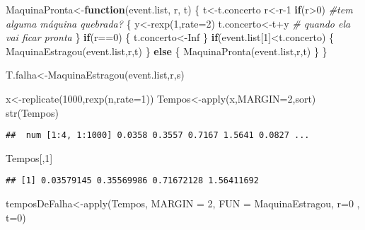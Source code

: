 \documentclass[
  12pt,
]{article}
\newenvironment{Shaded}{\begin{snugshade}}{\end{snugshade}}
\newcommand{\AttributeTok}[1]{\textcolor[rgb]{0.77,0.63,0.00}{#1}}
\newcommand{\CommentTok}[1]{\textcolor[rgb]{0.56,0.35,0.01}{\textit{#1}}}
\newcommand{\ConstantTok}[1]{\textcolor[rgb]{0.00,0.00,0.00}{#1}}
\newcommand{\ControlFlowTok}[1]{\textcolor[rgb]{0.13,0.29,0.53}{\textbf{#1}}}
\newcommand{\DecValTok}[1]{\textcolor[rgb]{0.00,0.00,0.81}{#1}}
\newcommand{\FunctionTok}[1]{\textcolor[rgb]{0.00,0.00,0.00}{#1}}
\newcommand{\NormalTok}[1]{#1}
\newcommand{\OtherTok}[1]{\textcolor[rgb]{0.56,0.35,0.01}{#1}}
\newcommand{\SpecialCharTok}[1]{\textcolor[rgb]{0.00,0.00,0.00}{#1}}
\begin{document}
\begin{Shaded}
\begin{Highlighting}[]
\NormalTok{MaquinaPronta}\OtherTok{\textless{}{-}}\ControlFlowTok{function}\NormalTok{(event.list, r, t)}
\NormalTok{\{}
\NormalTok{  t}\OtherTok{\textless{}{-}}\NormalTok{t.concerto}
\NormalTok{  r}\OtherTok{\textless{}{-}}\NormalTok{r}\DecValTok{{-}1}
  \ControlFlowTok{if}\NormalTok{(r}\SpecialCharTok{\textgreater{}}\DecValTok{0}\NormalTok{) }\CommentTok{\#tem alguma máquina quebrada?}
\NormalTok{  \{}
\NormalTok{    y}\OtherTok{\textless{}{-}}\FunctionTok{rexp}\NormalTok{(}\DecValTok{1}\NormalTok{,}\AttributeTok{rate=}\DecValTok{2}\NormalTok{)}
\NormalTok{    t.concerto}\OtherTok{\textless{}{-}}\NormalTok{t}\SpecialCharTok{+}\NormalTok{y }\CommentTok{\# quando ela vai ficar pronta}
\NormalTok{  \}}
  \ControlFlowTok{if}\NormalTok{(r}\SpecialCharTok{==}\DecValTok{0}\NormalTok{)}
\NormalTok{  \{}
\NormalTok{    t.concerto}\OtherTok{\textless{}{-}}\ConstantTok{Inf}
\NormalTok{  \}}
  \ControlFlowTok{if}\NormalTok{(event.list[}\DecValTok{1}\NormalTok{]}\SpecialCharTok{\textless{}}\NormalTok{t.concerto)}
\NormalTok{  \{}
    \FunctionTok{MaquinaEstragou}\NormalTok{(event.list,r,t)}
\NormalTok{  \}}
  \ControlFlowTok{else}
\NormalTok{  \{}
    \FunctionTok{MaquinaPronta}\NormalTok{(event.list,r,t)}
\NormalTok{  \}}
\NormalTok{\}}

\NormalTok{T.falha}\OtherTok{\textless{}{-}}\FunctionTok{MaquinaEstragou}\NormalTok{(event.list,r,s)}



\NormalTok{x}\OtherTok{\textless{}{-}}\FunctionTok{replicate}\NormalTok{(}\DecValTok{1000}\NormalTok{,}\FunctionTok{rexp}\NormalTok{(n,}\AttributeTok{rate=}\DecValTok{1}\NormalTok{))}
\NormalTok{Tempos}\OtherTok{\textless{}{-}}\FunctionTok{apply}\NormalTok{(x,}\AttributeTok{MARGIN=}\DecValTok{2}\NormalTok{,sort)}
\FunctionTok{str}\NormalTok{(Tempos)}
\end{Highlighting}
\end{Shaded}

\begin{verbatim}
##  num [1:4, 1:1000] 0.0358 0.3557 0.7167 1.5641 0.0827 ...
\end{verbatim}

\begin{Shaded}
\begin{Highlighting}[]
\NormalTok{Tempos[,}\DecValTok{1}\NormalTok{]}
\end{Highlighting}
\end{Shaded}

\begin{verbatim}
## [1] 0.03579145 0.35569986 0.71672128 1.56411692
\end{verbatim}

\begin{Shaded}
\begin{Highlighting}[]
\NormalTok{temposDeFalha}\OtherTok{\textless{}{-}}\FunctionTok{apply}\NormalTok{(Tempos, }\AttributeTok{MARGIN =} \DecValTok{2}\NormalTok{, }\AttributeTok{FUN =}\NormalTok{ MaquinaEstragou, }\AttributeTok{r=}\DecValTok{0}\NormalTok{ , }\AttributeTok{t=}\DecValTok{0}\NormalTok{)}
\end{Highlighting}
\end{Shaded}
\end{document}
